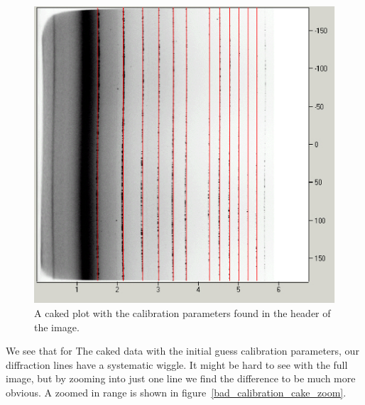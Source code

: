 \begin{figure}[h]
    \centering
    \includegraphics[scale=.75]{figures/bad_calibration_cake.eps}
    \caption{A caked plot with the calibration parameters
        found in the header of the image.}
    \label{bad_calibration_cake}
\end{figure}

We see that for The caked data with the initial guess 
calibration parameters, our diffraction lines
have a systematic wiggle. It might be hard to see 
with the full image, but by zooming into just one
line we find the difference to be much more obvious.
A zoomed in range is shown in 
figure~\ref{bad_calibration_cake_zoom}.

